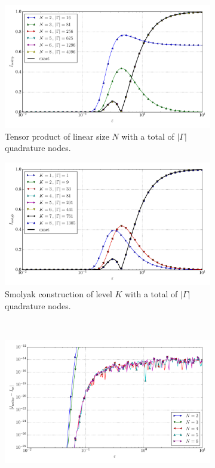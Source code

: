 \documentclass[a4paper,10pt]{article}
\begin{document}
\begin{figure}[ht!]
  \begin{subfigure}[t]{0.5\linewidth}
    \includegraphics[width=\linewidth]{./plots/tp_sg_4d_conv_eps_(3,0,0,0)_(3,0,0,0)_val_nsd_tp.pdf}
    \caption{Tensor product of linear size $N$ with a total of $|\Gamma|$ quadrature nodes.}
    \label{fig:tp_sg_4d_conv_p_3000_3000_val_nsd_tp}
  \end{subfigure}
  \begin{subfigure}[t]{0.5\linewidth}
    \includegraphics[width=\linewidth]{./plots/tp_sg_4d_conv_eps_(3,0,0,0)_(3,0,0,0)_val_nsd_gk.pdf}
    \caption{Smolyak construction of level $K$ with a total of $|\Gamma|$ quadrature nodes.}
    \label{fig:tp_sg_4d_conv_p_3000_3000_val_nsd_gk}
  \end{subfigure} \\
  \begin{subfigure}[t]{0.5\linewidth}
    \includegraphics[width=\linewidth]{./plots/tp_sg_4d_conv_eps_(3,0,0,0)_(3,0,0,0)_err_nsd_tp.pdf}

\end{subfigure}
\end{figure}
\end{document}
